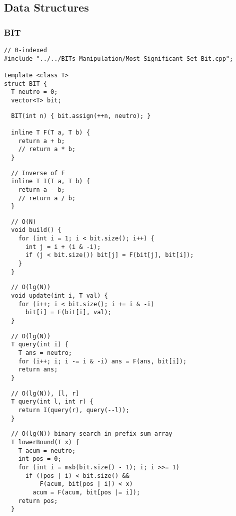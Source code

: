 \documentclass[twoside]{article}
\newcommand{\fileTitleStyle}{\large\underline}
\begin{document}
\begin{multicols*}{2}
\subsection*{Data Structures}
\vspace{2em}
\subsubsectionfont{\centering\bfseries\Large}
\subsubsectionfont{\fileTitleStyle}
\subsubsection*{BIT}
\begin{verbatim}
// 0-indexed
#include "../../BITs Manipulation/Most Significant Set Bit.cpp";

template <class T>
struct BIT {
  T neutro = 0;
  vector<T> bit;
\end{verbatim}
\vspace{-12pt}
\begin{verbatim}
  BIT(int n) { bit.assign(++n, neutro); }

  inline T F(T a, T b) {
    return a + b;
    // return a * b;
  }
\end{verbatim}
\vspace{-12pt}
\begin{verbatim}
  // Inverse of F
  inline T I(T a, T b) {
    return a - b;
    // return a / b;
  }
\end{verbatim}
\vspace{-12pt}
\begin{verbatim}
  // O(N)
  void build() {
    for (int i = 1; i < bit.size(); i++) {
      int j = i + (i & -i);
      if (j < bit.size()) bit[j] = F(bit[j], bit[i]);
    }
  }
\end{verbatim}
\vspace{-12pt}
\begin{verbatim}
  // O(lg(N))
  void update(int i, T val) {
    for (i++; i < bit.size(); i += i & -i)
      bit[i] = F(bit[i], val);
  }
\end{verbatim}
\vspace{-12pt}
\begin{verbatim}
  // O(lg(N))
  T query(int i) {
    T ans = neutro;
    for (i++; i; i -= i & -i) ans = F(ans, bit[i]);
    return ans;
  }
\end{verbatim}
\vspace{-12pt}
\begin{verbatim}
  // O(lg(N)), [l, r]
  T query(int l, int r) {
    return I(query(r), query(--l));
  }
\end{verbatim}
\vspace{-12pt}
\begin{verbatim}
  // O(lg(N)) binary search in prefix sum array
  T lowerBound(T x) {
    T acum = neutro;
    int pos = 0;
    for (int i = msb(bit.size() - 1); i; i >>= 1)
      if ((pos | i) < bit.size() &&
          F(acum, bit[pos | i]) < x)
        acum = F(acum, bit[pos |= i]);
    return pos;
  }


\end{verbatim}
\end{multicols*}
\end{document}
